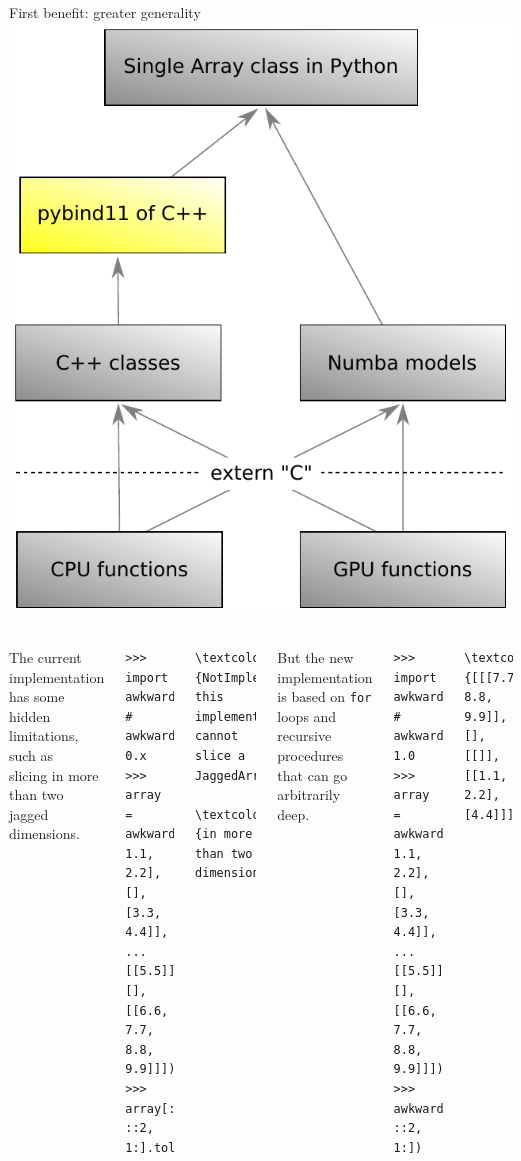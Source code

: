 \documentclass[aspectratio=169]{beamer}
\begin{document}
\begin{frame}[fragile]{First benefit: greater generality}
\large
\vspace{0.35 cm}
\hfill\mbox{\includegraphics[height=4 cm]{awkward-1-0-layers-mini-pybind11.pdf}\hspace{-0.75 cm}}

\vspace{-4 cm}
\begin{columns}
The current implementation has some hidden limitations, such as \\ slicing in more than two jagged dimensions.

\scriptsize
\vspace{0.1 cm}
\begin{verbatim}
>>> import awkward    # awkward 0.x
>>> array = awkward.fromiter([[[0.0, 1.1, 2.2], [], [3.3, 4.4]],
...                           [[5.5]], [], [[6.6, 7.7, 8.8, 9.9]]])
>>> array[::-1, ::2, 1:].tolist()
\end{verbatim}
\begin{Verbatim}[commandchars=\\\{\}]
\textcolor{red}{NotImplementedError: this implementation cannot slice a JaggedArray}
                     \textcolor{red}{in more than two dimensions}
\end{Verbatim}

\large
\vspace{0.5 cm}
But the new implementation is based on \texttt{for} loops and recursive procedures that can go arbitrarily deep.

\scriptsize
\vspace{0.1 cm}
\begin{verbatim}
>>> import awkward1   # awkward 1.0
>>> array = awkward1.fromiter([[[0.0, 1.1, 2.2], [], [3.3, 4.4]],
...                            [[5.5]], [], [[6.6, 7.7, 8.8, 9.9]]])
>>> awkward1.tolist(array[::-1, ::2, 1:])
\end{verbatim}
\begin{Verbatim}[commandchars=\\\{\}]
\textcolor{red}{[[[7.7, 8.8, 9.9]], [], [[]], [[1.1, 2.2], [4.4]]]}
\end{Verbatim}

\vspace{5 cm}
\end{columns}
\end{frame}
\end{document}
